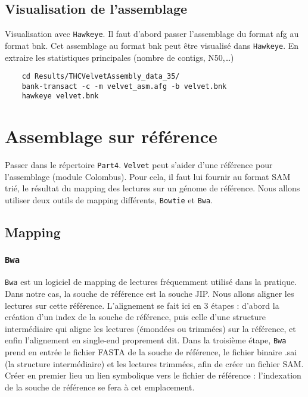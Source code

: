 \documentclass[a4paper,12pt]{article}
\begin{document}
\subsection{Visualisation de l'assemblage}

Visualisation avec \verb=Hawkeye=. Il faut d'abord passer l'assemblage du format afg au format bnk. Cet assemblage au format bnk peut être visualisé dans \verb=Hawkeye=. En extraire les statistiques principales (nombre de contigs, N50,\ldots) 
\begin{lstlisting}	
	cd Results/THCVelvetAssembly_data_35/
	bank-transact -c -m velvet_asm.afg -b velvet.bnk
	hawkeye velvet.bnk
\end{lstlisting}


\section{Assemblage sur référence}
\label{sec:assr}

Passer dans le répertoire \verb=Part4=. \verb=Velvet= peut s'aider d'une référence pour l'assemblage (module Colombus). Pour cela, il faut lui fournir au format SAM trié, le résultat du mapping des lectures sur un génome de référence. Nous allons utiliser deux outils de mapping différents, \verb=Bowtie= et \verb=Bwa=.

\subsection{Mapping}

\subsubsection{\tt{Bwa}}
{\tt Bwa} est un logiciel de mapping de lectures fréquemment utilisé dans la pratique. Dans notre cas, la souche de référence est la souche JIP. Nous allons aligner les lectures sur cette référence. L'alignement se fait ici en 3 étapes : d'abord la création d'un index de la souche de référence, puis celle d'une structure intermédiaire qui aligne les lectures (émondées ou trimmées) sur la référence, et enfin l'alignement en single-end proprement dit. Dans la troisième étape, {\tt Bwa} prend en entrée le fichier FASTA de la souche de référence, le fichier binaire .sai (la structure intermédiaire) et les lectures trimmées, afin de créer un fichier SAM.
Créer en premier lieu un lien symbolique vers le fichier de référence : l'indexation de la souche de référence se fera à cet emplacement.
\end{document}
